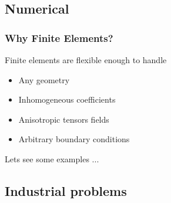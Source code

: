 \documentclass[handout]{beamer}
{
\usepackage{fullpage}
\usepackage{hyperref}
\usepackage{amssymb} 
}
\begin{document}
\subsection{Numerical}

\begin{frame}
\frametitle{Why Finite Elements?}

\begin{block}{Finite elements are flexible enough to handle}
\begin{itemize}
\item Any geometry
\item Inhomogeneous coefficients
\item Anisotropic tensors fields
\item Arbitrary boundary conditions
\end{itemize}
\end{block}

\vspace{2cm}
Lets see some examples ...
\end{frame}



\subsection{Industrial problems}
\end{document}

